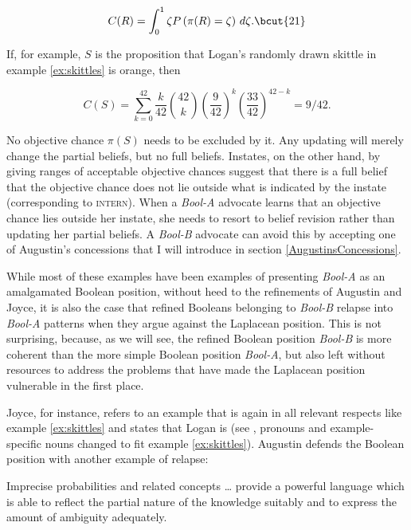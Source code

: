 \documentclass[11pt]{article}
\newcommand{\anderson}[0]{\textit{Bool-A}}
\newcommand{\augustin}[0]{\textit{Bool-B}}
\begin{document}
\begin{equation}
  \label{eq:s2}
  C(R)=\int_{0}^{1}\zeta{}P\left(\pi(R)=\zeta\right)\,d\zeta{}.\bcut{21}
\end{equation}

{\noindent}If, for example, $S$ is the proposition that Logan's
randomly drawn skittle in example \ref{ex:skittles} is orange, then

\begin{equation}
  \label{eq:skit}
  C(S)=\sum_{k=0}^{42}\frac{k}{42}\binom{42}{k}\left(\frac{9}{42}\right)^{k}\left(\frac{33}{42}\right)^{42-k}=9/42.
\end{equation}

No objective chance $\pi(S)$ needs to be excluded by it. Any updating
will merely change the partial beliefs, but no full beliefs. Instates,
on the other hand, by giving ranges of acceptable objective chances
suggest that there is a full belief that the objective chance does not
lie outside what is indicated by the instate (corresponding to
\textsc{intern}). When a {\anderson} advocate learns that an objective
chance lies outside her instate, she needs to resort to belief
revision rather than updating her partial beliefs. A {\augustin}
advocate can avoid this by accepting one of Augustin's concessions
that I will introduce in section \ref{AugustinsConcessions}.

While most of these examples have been examples of presenting
{\anderson} as an amalgamated Boolean position, without heed to the
refinements of Augustin and Joyce, it is also the case that refined
Booleans belonging to {\augustin} relapse into {\anderson} patterns
when they argue against the Laplacean position. This is not
surprising, because, as we will see, the refined Boolean position
{\augustin} is more coherent than the more simple Boolean position
{\anderson}, but also left without resources to address the problems
that have made the Laplacean position vulnerable in the first place.

Joyce, for instance, refers to an example that is again in all
relevant respects like example \ref{ex:skittles} and states that Logan
is  (see ,
pronouns and example-specific nouns changed to fit example
\ref{ex:skittles}). Augustin defends the Boolean position with another
example of relapse:

\begin{quotex}
  Imprecise probabilities and related concepts {\ldots} provide a
  powerful language which is able to reflect the partial nature of the
  knowledge suitably and to express the amount of ambiguity
  adequately. 
\end{quotex}
\end{document}
